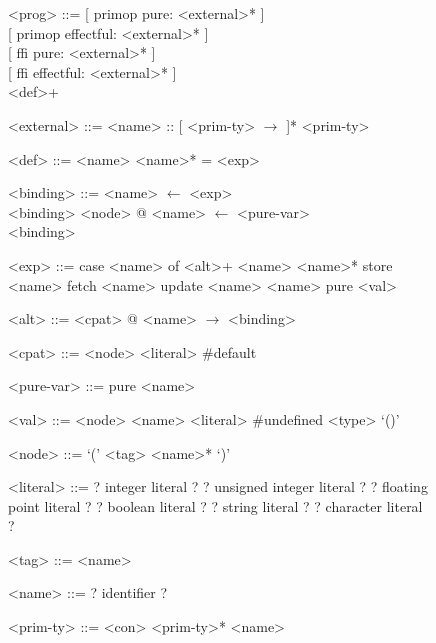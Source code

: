 \documentclass[main.tex]{subfiles}
\begin{document}
	
	
	\begin{figure}[h]
	
		\setlength{\grammarparsep}{0.1cm} %
		\setlength{\grammarindent}{2.5cm} %
		\begin{grammar}
			<prog> ::= {[} primop pure: <external>* {]} \\ 
			{[} primop effectful: <external>* {]} \\
			{[} ffi pure: <external>* {]} \\
			{[} ffi effectful: <external>* {]} \\
			<def>+
			
			<external> ::= <name> :: {[} <prim-ty> $\rightarrow$ {]}* <prim-ty>
			
			<def> ::= <name> <name>* = <exp>
		\end{grammar}
	
		\begin{minipage}{0.5\textwidth}
			\setlength{\grammarindent}{2.5cm} %
			\begin{grammar}
				
				<binding> ::= <name> $\leftarrow$ <exp> \\ <binding>
				\alt <node> @ <name> $\leftarrow$ <pure-var> \\ <binding>
				\alt <pure-var>
				
				<exp> ::= case <name> of <alt>+   
				\alt <name> <name>*
				\alt store <name>
				\alt fetch <name>
				\alt update <name> <name>
				\alt pure <val>
				
				<alt> ::= <cpat> @ <name> $\rightarrow$ <binding>
				
				<cpat> ::= <node>
				\alt <literal>
				\alt \#default
				
				<pure-var> ::= pure <name>
				
				<val> ::= <node> 
				\alt <name>
				\alt <literal>
				\alt \#undefined <type>
				\alt `()'
				
				<node> ::= `(' <tag> <name>* `)'
				
				<literal> ::= ? integer literal ?
				\alt ? unsigned integer literal ?
				\alt ? floating point literal ?
				\alt ? boolean literal ?
				\alt ? string literal ?
				\alt ? character literal ?
				
				<tag> ::= <name>
				
				<name> ::= ? identifier ?
				
			\end{grammar}
		\end{minipage}
		\hfill
		\begin{minipage}{0.45\textwidth}
				\vspace{-1.75cm}
			\setlength{\grammarindent}{2.75cm} %
			\begin{grammar}
				<prim-ty> ::= <con> <prim-ty>*
				\alt <name>
				\alt <simple-ty>
				

\end{grammar}
\end{minipage}
\end{figure}
\end{document}
